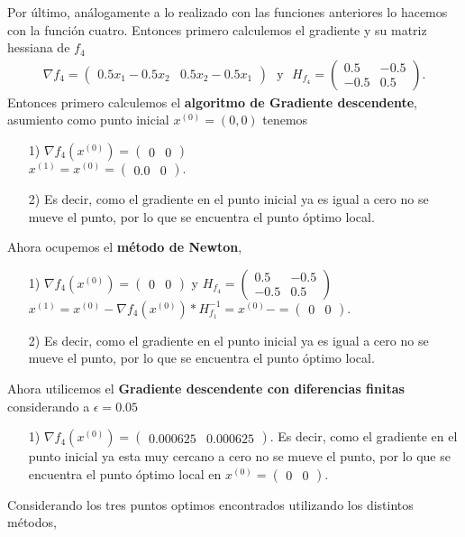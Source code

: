\documentclass[11pt,letterpaper]{article}
\begin{document}
\begin{enumerate}
Por último, análogamente a lo realizado con las funciones anteriores lo hacemos con la función cuatro. Entonces primero calculemos el gradiente y su matriz hessiana de $f_4$
\begin{align*}
\nabla f_4 =\begin{pmatrix} 0.5x_1-0.5x_2&0.5x_2-0.5x_1 \end{pmatrix} \ \ \ \text{y}\ \ \ H_{f_4}=\begin{pmatrix}
0.5 & -0.5\\ -0.5 & 0.5
\end{pmatrix}.
\end{align*}
Entonces primero calculemos el \textbf{algoritmo de Gradiente descendente}, asumiento como punto inicial $x^{(0)}=(0,0)$ tenemos 
\begin{enumerate}
\item[1)] $\nabla f_4(x^{(0)})=\begin{pmatrix}
0 & 0
\end{pmatrix}$\\
$x^{(1)}=x^{(0)}=\begin{pmatrix}
0.0 & 0
\end{pmatrix}. $
\item[2)] Es decir, como el gradiente en el punto inicial ya es igual a cero no se mueve el punto, por lo que se encuentra el punto óptimo local.
\end{enumerate}
Ahora ocupemos el \textbf{método de Newton},
\begin{enumerate}
\item[1)] $\nabla f_4(x^{(0)})=\begin{pmatrix}
0 & 0
\end{pmatrix}$ y $H_{f_4}=\begin{pmatrix}
0.5 & -0.5\\ -0.5 & 0.5
\end{pmatrix}$\\
$x^{(1)}=x^{(0)}-\nabla f_4(x^{(0)})*H_{f_1}^{-1} =x^{(0)}-=\begin{pmatrix}
0 & 0
\end{pmatrix}. $
\item[2)] Es decir, como el gradiente en el punto inicial ya es igual a cero no se mueve el punto, por lo que se encuentra el punto óptimo local.
\end{enumerate}
Ahora utilicemos el \textbf{Gradiente descendente con diferencias finitas } considerando a $\epsilon=0.05$
\begin{enumerate}
\item[1)] $\nabla f_4(x^{(0)})=\begin{pmatrix}
0.000625 & 0.000625
\end{pmatrix}$. Es decir, como el gradiente en el punto inicial ya esta muy cercano a cero no se mueve el punto, por lo que se encuentra el punto óptimo local en $x^{(0)}=\begin{pmatrix}
0 & 0
\end{pmatrix}$.
\end{enumerate}
Considerando los tres puntos optimos encontrados utilizando los distintos métodos,


\end{enumerate}
\end{document}
